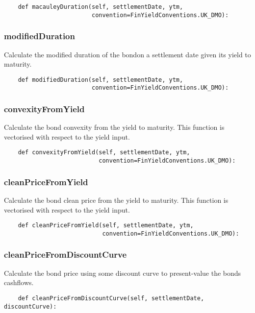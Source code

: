 \documentclass[twoside,11pt]{book}
\begin{document}
\begin{lstlisting}
    def macauleyDuration(self, settlementDate, ytm,
                         convention=FinYieldConventions.UK_DMO):
\end{lstlisting}

\subsubsection*{{\bf modifiedDuration}}
Calculate the modified duration of the bondon a settlement date given its yield to maturity.  

\begin{lstlisting}
    def modifiedDuration(self, settlementDate, ytm,
                         convention=FinYieldConventions.UK_DMO):
\end{lstlisting}

\subsubsection*{{\bf convexityFromYield}}
Calculate the bond convexity from the yield to maturity. This function is vectorised with respect to the yield input.  

\begin{lstlisting}
    def convexityFromYield(self, settlementDate, ytm,
                           convention=FinYieldConventions.UK_DMO):
\end{lstlisting}

\subsubsection*{{\bf cleanPriceFromYield}}
Calculate the bond clean price from the yield to maturity. This function is vectorised with respect to the yield input.  

\begin{lstlisting}
    def cleanPriceFromYield(self, settlementDate, ytm,
                            convention=FinYieldConventions.UK_DMO):
\end{lstlisting}

\subsubsection*{{\bf cleanPriceFromDiscountCurve}}
Calculate the bond price using some discount curve to present-value the bonds cashflows.  

\begin{lstlisting}
    def cleanPriceFromDiscountCurve(self, settlementDate, discountCurve):
\end{lstlisting}
\end{document}
